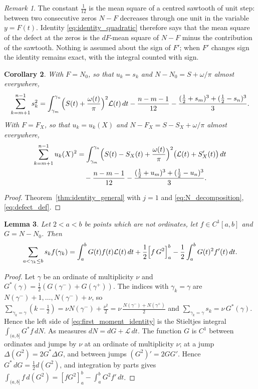 \documentclass[11pt,reqno]{amsart}
\theoremstyle{plain}\newtheorem{theorem}{Theorem}[section]\newtheorem{proposition}[theorem]{Proposition}\newtheorem{lemma}[theorem]{Lemma}\newtheorem{corollary}[theorem]{Corollary}
\theoremstyle{definition}\newtheorem{hypothesis}[theorem]{Hypothesis}\newtheorem{definition}[theorem]{Definition}
\theoremstyle{remark}\newtheorem{remark}[theorem]{Remark}\newtheorem{experiment}[theorem]{Experiment}\newtheorem{question}[theorem]{Question}\newtheorem{heuristic}[theorem]{Heuristic}\newtheorem{conjecture}[theorem]{Conjecture}
\newcommand{\NO}{N_0}\newcommand{\lL}{\mathcal L}\newcommand{\IT}{\mathcal I_T}\newcommand{\R}{\mathbb R}\newcommand{\N}{\mathbb N}\newcommand{\eps}{\varepsilon}\newcommand{\sgn}{\operatorname{sgn}}
\begin{document}
\begin{remark}\label{rem:twelfth}
The constant $\frac1{12}$ is the mean square of a centred sawtooth of unit step: between two consecutive zeros $N-F$ decreases through one unit in the variable $y=F(t)$. Identity \eqref{eq:identity_quadratic} therefore says that the mean square of the defect at the zeros is the $dF$-mean square of $N-F$ minus the contribution of the sawtooth. Nothing is assumed about the sign of $F'$; when $F'$ changes sign the identity remains exact, with the integral counted with sign.
\end{remark}

\begin{corollary}\label{cor:identity_clock}
With $F=\NO$, so that $u_k=s_k$ and $N-\NO=S+\omega/\pi$ almost everywhere,
\begin{equation}
\sum_{k=m+1}^{n-1}s_k^2=\int_{\gamma_m}^{\gamma_n}\Bigl(S(t)+\frac{\omega(t)}\pi\Bigr)^2\lL(t)\,dt-\frac{n-m-1}{12}-\frac{(\frac12+s_m)^3+(\frac12-s_n)^3}3 .
\label{eq:identity_clock}
\end{equation}
With $F=F_X$, so that $u_k=u_k(X)$ and $N-F_X=S-S_X+\omega/\pi$ almost everywhere,
\begin{align}
\sum_{k=m+1}^{n-1}u_k(X)^2
&=\int_{\gamma_m}^{\gamma_n}\Bigl(S(t)-S_X(t)+\frac{\omega(t)}\pi\Bigr)^2
  \bigl(\lL(t)+S_X'(t)\bigr)\,dt \\
&\quad-\frac{n-m-1}{12}
-\frac{(\frac12+u_m)^3+(\frac12-u_n)^3}{3}.
\label{eq:identity_LeClair}
\end{align}
\end{corollary}

\begin{proof}
Theorem~\ref{thm:identity_general} with $j=1$ and \eqref{eq:N_decomposition}, \eqref{eq:defect_def}.
\end{proof}

\begin{lemma}\label{lem:first_moment_identity}
Let $2<a<b$ be points which are not ordinates, let $f\in C^1[a,b]$ and $G=N-\NO$. Then
\begin{equation}
\sum_{a<\gamma_k\le b}s_kf(\gamma_k)=\int_a^bG(t)f(t)\lL(t)\,dt+\frac12\Bigl[f\,G^2\Bigr]_a^b-\frac12\int_a^bG(t)^2f'(t)\,dt .
\label{eq:first_moment_identity}
\end{equation}
\end{lemma}

\begin{proof}
Let $\gamma$ be an ordinate of multiplicity $\nu$ and $G^*(\gamma)=\frac12(G(\gamma^-)+G(\gamma^+))$. The indices with $\gamma_k=\gamma$ are $N(\gamma^-)+1,\dots,N(\gamma^-)+\nu$, so $\sum_{\gamma_k=\gamma}(k-\frac12)=\nu N(\gamma^-)+\frac{\nu^2}2=\nu\,\frac{N(\gamma^-)+N(\gamma^+)}2$ and $\sum_{\gamma_k=\gamma}s_k=\nu\,G^*(\gamma)$. Hence the left side of \eqref{eq:first_moment_identity} is the Stieltjes integral $\int_{(a,b]}G^*f\,dN$. As measures $dN=dG+\lL\,dt$. The function $G$ is $C^1$ between ordinates and jumps by $\nu$ at an ordinate of multiplicity $\nu$; at a jump $\Delta(G^2)=2G^*\Delta G$, and between jumps $(G^2)'=2GG'$. Hence $G^*\,dG=\frac12d(G^2)$, and integration by parts gives $\int_{(a,b]}f\,d(G^2)=[fG^2]_a^b-\int_a^bG^2f'\,dt$.
\end{proof}
\end{document}
